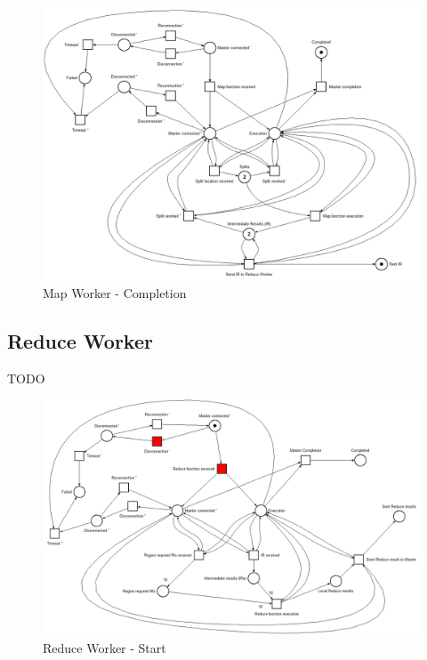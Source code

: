 \begin{figure}[!ht]
    \centering
    \includegraphics[width=\linewidth]{document/chapters/chapter_6/images/map_worker_petri_net_7.png}
    \caption{Map Worker - Completion}
    \label{fig:map_worker_petri_net_7}
\end{figure}

\subsection{Reduce Worker}
TODO

\begin{figure}[!ht]
    \centering
    \includegraphics[width=\linewidth]{document/chapters/chapter_6/images/reduce_worker_petri_net_1.png}
    \caption{Reduce Worker - Start}
    \label{fig:map_worker_petri_net_1}
\end{figure}

